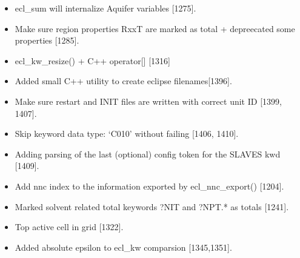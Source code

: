 \documentclass[a4paper,10pt,english]{sphinxmanual}
\begin{document}
\begin{itemize}
\item {} 
ecl\_sum will internalize Aquifer variables {[}1275{]}.

\item {} 
Make sure region properties RxxT are marked as total + depreecated some properties {[}1285{]}.

\item {} 
ecl\_kw\_resize() + C++ operator{[}{]} {[}1316{]}

\item {} 
Added small C++ utility to create eclipse filenames{[}1396{]}.

\item {} 
Make sure restart and INIT files are written with correct unit ID {[}1399, 1407{]}.

\item {} 
Skip keyword data type: ‘C010’ without failing {[}1406, 1410{]}.

\item {} 
Adding parsing of the last (optional) config token for the SLAVES kwd {[}1409{]}.

\item {} 
Add nnc index to the information exported by ecl\_nnc\_export() {[}1204{]}.

\item {} 
Marked solvent related total keywords ?NIT and ?NPT.* as totals {[}1241{]}.

\item {} 
Top active cell in grid {[}1322{]}.

\item {} 
Added absolute epsilon to ecl\_kw comparsion {[}1345,1351{]}.

\end{itemize}
\end{document}
